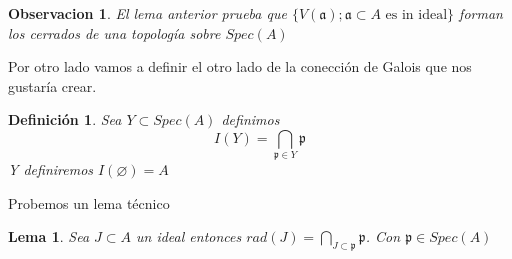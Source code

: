 \documentclass{article}
\newtheorem{definicion}{Definición}
\newtheorem{lema}{Lema}
\newtheorem{observacion}{Observacion}
\begin{document}
\begin{observacion}
    El lema anterior prueba que $\{V(\mathfrak{a}); \mathfrak{a} \subset A \mbox{ es in ideal}\}$
    forman los cerrados de una topología sobre $Spec(A)$
\end{observacion}

Por otro lado vamos a definir el otro lado de la conección de 
Galois que nos gustaría crear.

\begin{definicion}
    Sea $Y \subset Spec(A)$ definimos
    $$I(Y) = \bigcap_{\mathfrak{p}\in Y} \mathfrak{p}$$
    Y definiremos $I(\varnothing) = A$
\end{definicion}

Probemos un lema técnico
\begin{lema}
    Sea $J \subset A$ un ideal entonces
    $rad(J) = \bigcap_{J \subset\mathfrak{p}} \mathfrak{p}$.
    Con $\mathfrak{p} \in Spec(A)$
\end{lema}
\end{document}
